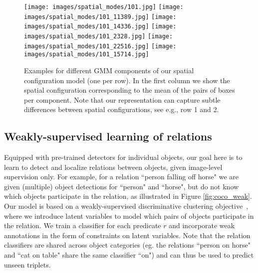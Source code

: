 \documentclass[10pt,twocolumn,letterpaper]{article}
\begin{document}
\begin{figure*}[t]
    \begin{minipage}[b]{\textwidth}
       \texttt{[image: images/spatial\_modes/101.jpg]}
       \texttt{[image: images/spatial\_modes/101\_11389.jpg]}
       \texttt{[image: images/spatial\_modes/101\_14336.jpg]}
       \texttt{[image: images/spatial\_modes/101\_2328.jpg]}
       \texttt{[image: images/spatial\_modes/101\_22516.jpg]}
       \texttt{[image: images/spatial\_modes/101\_15714.jpg]}
       \vspace{-0.5ex}
    \end{minipage}   
    \setlength\abovecaptionskip{0.3cm}
    \caption{%
      Examples for different GMM components of our spatial configuration model (one
      per row). In the first column we show the spatial configuration
      corresponding to the mean of the pairs of boxes per
      component. Note that our representation can capture subtle
      differences between spatial configurations, see e.g., row 1 and 2.} 
      \vspace{-.4cm}
    \label{GMM_components}
\end{figure*}

\subsection{Weakly-supervised learning of relations}
\label{model}

Equipped with pre-trained detectors for individual objects, our goal here is to learn to detect and localize relations between objects, given image-level supervision only. For example, for a relation ``person falling off horse" we are given (multiple) object detections for ``person" and ``horse", but do not know which objects participate in the relation, as illustrated in Figure \ref{fig:coco_weak}. Our model is based on a weakly-supervised discriminative clustering objective~\cite{bach2008diffrac}, where we introduce latent variables to model which pairs of objects participate in the relation. We train a classifier for each predicate $r$ and incorporate weak annotations in the form of constraints on latent variables. Note that the relation classifiers are shared across object categories (eg. the relations ``person on horse" and ``cat on table" share the same classifier ``on") and can thus be used to predict unseen triplets.
\end{document}
